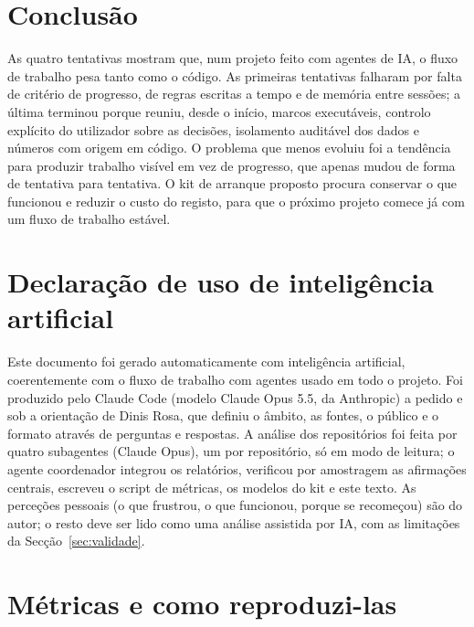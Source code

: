 \documentclass[11pt,a4paper]{article}
\begin{document}
\section{Conclusão}

As quatro tentativas mostram que, num projeto feito com agentes de IA, o fluxo de trabalho pesa
tanto como o código. As primeiras tentativas falharam por falta de critério de progresso, de
regras escritas a tempo e de memória entre sessões; a última terminou porque reuniu, desde o
início, marcos executáveis, controlo explícito do utilizador sobre as decisões, isolamento
auditável dos dados e números com origem em código. O problema que menos evoluiu foi a tendência
para produzir trabalho visível em vez de progresso, que apenas mudou de forma de tentativa para
tentativa. O kit de arranque proposto procura conservar o que funcionou e reduzir o custo do
registo, para que o próximo projeto comece já com um fluxo de trabalho estável.

\section*{Declaração de uso de inteligência artificial}

Este documento foi gerado automaticamente com inteligência artificial, coerentemente com o
fluxo de trabalho com agentes usado em todo o projeto. Foi produzido pelo Claude Code (modelo
Claude Opus 5.5, da Anthropic) a pedido e sob a orientação de Dinis Rosa, que definiu o âmbito,
as fontes, o público e o formato através de perguntas e respostas. A análise dos repositórios
foi feita por quatro subagentes (Claude Opus), um por repositório, só em modo de leitura; o
agente coordenador integrou os relatórios, verificou por amostragem as afirmações centrais,
escreveu o script de métricas, os modelos do kit e este texto. As perceções pessoais (o que
frustrou, o que funcionou, porque se recomeçou) são do autor; o resto deve ser lido como uma
análise assistida por IA, com as limitações da Secção~\ref{sec:validade}.

\newpage
\appendix
\section{Métricas e como reproduzi-las}\label{an:metricas}
\end{document}
